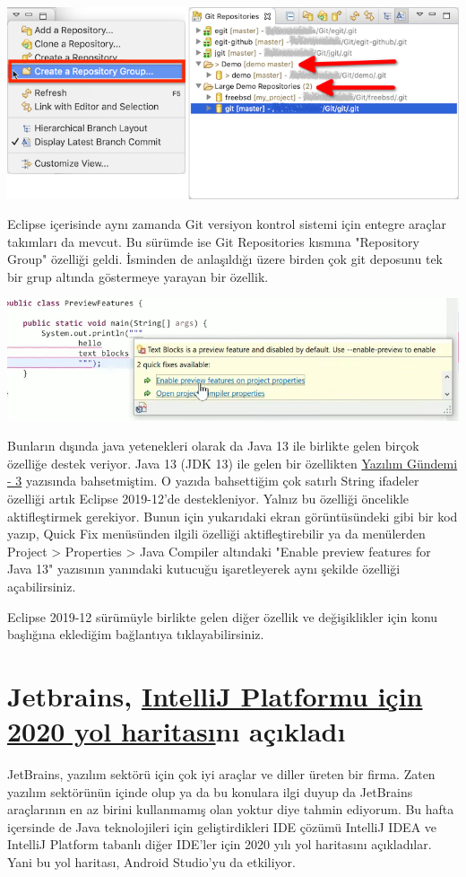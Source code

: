 \documentclass[11pt]{article}
\begin{document}
\begin{center}
\includegraphics[width=.9\linewidth]{gorseller/eclipse1912-git-group.png}
\end{center}

Eclipse içerisinde aynı zamanda Git versiyon kontrol sistemi için entegre
araçlar takımları da mevcut. Bu sürümde ise Git Repositories kısmına
"Repository Group" özelliği geldi. İsminden de anlaşıldığı üzere birden çok git
deposunu tek bir grup altında göstermeye yarayan bir özellik.

\begin{center}
\includegraphics[width=.9\linewidth]{gorseller/eclipse1912-coklu-satir-string.png}
\end{center}

Bunların dışında java yetenekleri olarak da Java 13 ile birlikte gelen birçok
özelliğe destek veriyor. Java 13 (JDK 13) ile gelen bir özellikten \href{../03/yazilim-gundemi-03.pdf}{Yazılım
Gündemi - 3} yazısında bahsetmiştim. O yazıda bahsettiğim çok satırlı String
ifadeler özelliği artık Eclipse 2019-12'de destekleniyor. Yalnız bu özelliği
öncelikle aktifleştirmek gerekiyor. Bunun için yukarıdaki ekran görüntüsündeki
gibi bir kod yazıp, Quick Fix menüsünden ilgili özelliği aktifleştirebilir ya
da menülerden Project > Properties > Java Compiler altındaki "Enable preview
features for Java 13" yazısının yanındaki kutucuğu işaretleyerek aynı şekilde
özelliği açabilirsiniz.

Eclipse 2019-12 sürümüyle birlikte gelen diğer özellik ve değişiklikler için
konu başlığına eklediğim bağlantıya tıklayabilirsiniz.
\section{Jetbrains, \href{https://blog.jetbrains.com/idea/2019/12/intellij-platform-roadmap-for-2020/}{IntelliJ Platformu için 2020 yol haritası}nı açıkladı}
\label{sec:org1681686}
JetBrains, yazılım sektörü için çok iyi araçlar ve diller üreten bir firma.
Zaten yazılım sektörünün içinde olup ya da bu konulara ilgi duyup da JetBrains
araçlarının en az birini kullanmamış olan yoktur diye tahmin ediyorum. Bu hafta
içersinde de Java teknolojileri için geliştirdikleri IDE çözümü IntelliJ IDEA
ve IntelliJ Platform tabanlı diğer IDE'ler için 2020 yılı yol haritasını
açıkladılar. Yani bu yol haritası, Android Studio'yu da etkiliyor.
\end{document}
